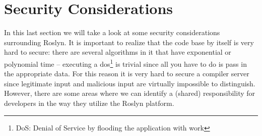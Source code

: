 \newpage
\section{Security Considerations}
\label{sec:security}

In this last section we will take a look at some security considerations surrounding Roslyn. It is important to realize that the code base by itself is very hard to secure: there are several algorithms in it that have exponential or polynomial time -- executing a \gls{dos}\footnote{DoS: Denial of Service by flooding the application with work} is trivial since all you have to do is pass in the appropriate data. For this reason it is very hard to secure a compiler server\parencite{Gocke2015} since legitimate input and malicious input are virtually impossible to distinguish. However, there are some areas where we can identify a (shared) responsibility for developers in the way they utilize the Roslyn platform.


